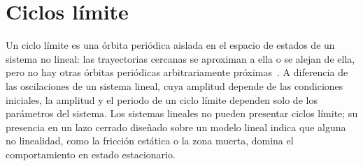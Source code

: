 \section{Ciclos límite}

Un ciclo límite es una órbita periódica aislada en el espacio de estados de un sistema no lineal: las trayectorias cercanas se aproximan a ella o se alejan de ella, pero no hay otras órbitas periódicas arbitrariamente próximas~\cite{khalil2,jean}. A diferencia de las oscilaciones de un sistema lineal, cuya amplitud depende de las condiciones iniciales, la amplitud y el periodo de un ciclo límite dependen solo de los parámetros del sistema. Los sistemas lineales no pueden presentar ciclos límite; su presencia en un lazo cerrado diseñado sobre un modelo lineal indica que alguna no linealidad, como la fricción estática o la zona muerta, domina el comportamiento en estado estacionario.
